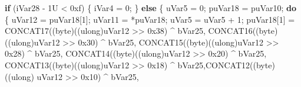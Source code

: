 \documentclass[
]{article}
\newenvironment{Shaded}{}{}
\newcommand{\BaseNTok}[1]{\textcolor[rgb]{0.25,0.63,0.44}{#1}}
\newcommand{\BuiltInTok}[1]{\textcolor[rgb]{0.00,0.50,0.00}{#1}}
\newcommand{\ControlFlowTok}[1]{\textcolor[rgb]{0.00,0.44,0.13}{\textbf{#1}}}
\newcommand{\DecValTok}[1]{\textcolor[rgb]{0.25,0.63,0.44}{#1}}
\newcommand{\ExtensionTok}[1]{#1}
\newcommand{\NormalTok}[1]{#1}
\newcommand{\OperatorTok}[1]{\textcolor[rgb]{0.40,0.40,0.40}{#1}}
\begin{document}
\begin{Shaded}
\begin{Highlighting}[]
    \ControlFlowTok{if} \OperatorTok{(}\NormalTok{iVar28 }\OperatorTok{{-}} \DecValTok{1}\BuiltInTok{U} \OperatorTok{\textless{}} \BaseNTok{0xf}\OperatorTok{)} \OperatorTok{\{}
\NormalTok{      iVar4 }\OperatorTok{=} \DecValTok{0}\OperatorTok{;}
    \OperatorTok{\}}
    \ControlFlowTok{else} \OperatorTok{\{}
\NormalTok{      uVar5 }\OperatorTok{=} \DecValTok{0}\OperatorTok{;}
\NormalTok{      puVar18 }\OperatorTok{=}\NormalTok{ puVar10}\OperatorTok{;}
      \ControlFlowTok{do} \OperatorTok{\{}
\NormalTok{        uVar12 }\OperatorTok{=}\NormalTok{ puVar18}\OperatorTok{[}\DecValTok{1}\OperatorTok{];}
\NormalTok{        uVar11 }\OperatorTok{=} \OperatorTok{*}\NormalTok{puVar18}\OperatorTok{;}
\NormalTok{        uVar5 }\OperatorTok{=}\NormalTok{ uVar5 }\OperatorTok{+} \DecValTok{1}\OperatorTok{;}
\NormalTok{        puVar18}\OperatorTok{[}\DecValTok{1}\OperatorTok{]} \OperatorTok{=}\NormalTok{ CONCAT17}\OperatorTok{((}\NormalTok{byte}\OperatorTok{)((}\ExtensionTok{ulong}\OperatorTok{)}\NormalTok{uVar12 }\OperatorTok{\textgreater{}\textgreater{}} \BaseNTok{0x38}\OperatorTok{)} \OperatorTok{\^{}}\NormalTok{ bVar25}\OperatorTok{,}
\NormalTok{                              CONCAT16}\OperatorTok{((}\NormalTok{byte}\OperatorTok{)((}\ExtensionTok{ulong}\OperatorTok{)}\NormalTok{uVar12 }\OperatorTok{\textgreater{}\textgreater{}} \BaseNTok{0x30}\OperatorTok{)} \OperatorTok{\^{}}\NormalTok{ bVar25}\OperatorTok{,}
\NormalTok{                                       CONCAT15}\OperatorTok{((}\NormalTok{byte}\OperatorTok{)((}\ExtensionTok{ulong}\OperatorTok{)}\NormalTok{uVar12 }\OperatorTok{\textgreater{}\textgreater{}} \BaseNTok{0x28}\OperatorTok{)} \OperatorTok{\^{}}\NormalTok{ bVar25}\OperatorTok{,}
\NormalTok{                                                CONCAT14}\OperatorTok{((}\NormalTok{byte}\OperatorTok{)((}\ExtensionTok{ulong}\OperatorTok{)}\NormalTok{uVar12 }\OperatorTok{\textgreater{}\textgreater{}} \BaseNTok{0x20}\OperatorTok{)} \OperatorTok{\^{}}\NormalTok{ bVar25}\OperatorTok{,}
\NormalTok{                                                         CONCAT13}\OperatorTok{((}\NormalTok{byte}\OperatorTok{)((}\ExtensionTok{ulong}\OperatorTok{)}\NormalTok{uVar12 }\OperatorTok{\textgreater{}\textgreater{}} \BaseNTok{0x18}\OperatorTok{)} \OperatorTok{\^{}}
\NormalTok{                                                                  bVar25}\OperatorTok{,}\NormalTok{CONCAT12}\OperatorTok{((}\NormalTok{byte}\OperatorTok{)((}\ExtensionTok{ulong}\OperatorTok{)}
\NormalTok{                                                  uVar12 }\OperatorTok{\textgreater{}\textgreater{}} \BaseNTok{0x10}\OperatorTok{)} \OperatorTok{\^{}}\NormalTok{ bVar25}\OperatorTok{,}

\end{Highlighting}
\end{Shaded}
\end{document}
